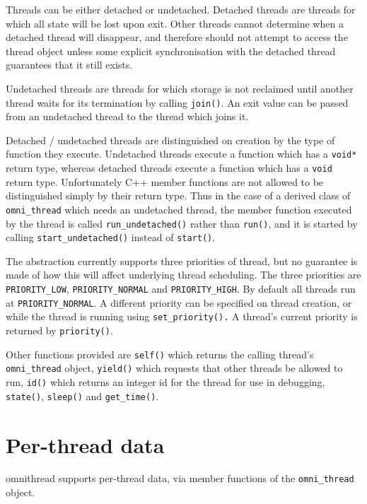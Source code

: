 \documentclass[11pt,twoside,a4paper]{article}
\newcommand{\dsc}{\discretionary{}{}}
\begin{document}
Threads can be either detached or undetached.  Detached threads are
threads for which all state will be lost upon exit.  Other threads
cannot determine when a detached thread will disappear, and therefore
should not attempt to access the thread object unless some explicit
synchronisation with the detached thread guarantees that it still
exists.

Undetached threads are threads for which storage is not reclaimed
until another thread waits for its termination by calling
\texttt{join()}.  An exit value can be passed from an undetached
thread to the thread which joins it.

Detached / undetached threads are distinguished on creation by the
type of function they execute.  Undetached threads execute a function
which has a \texttt{void*} return type, whereas detached threads
execute a function which has a \texttt{void} return type.
Unfortunately C++ member functions are not allowed to be distinguished
simply by their return type.  Thus in the case of a derived class of
\texttt{omni\_thread} which needs an undetached thread, the member
function executed by the thread is called \texttt{run\_undetached()}
rather than \texttt{run()}, and it is started by calling
\texttt{start\_\dsc{}undetached()} instead of \texttt{start()}.

The abstraction currently supports three priorities of thread, but no
guarantee is made of how this will affect underlying thread
scheduling.  The three priorities are \texttt{PRIORITY\_LOW},
\texttt{PRIORITY\_NORMAL} and \texttt{PRIORITY\_HIGH}.  By default all
threads run at \texttt{PRIORITY\_NORMAL}.  A different priority can be
specified on thread creation, or while the thread is running using
\texttt{set\_priority().}  A thread's current priority is returned by
\texttt{priority()}.

Other functions provided are \texttt{self()} which returns the calling
thread's \texttt{omni\_\dsc{}thread} object, \texttt{yield()} which
requests that other threads be allowed to run, \texttt{id()} which
returns an integer id for the thread for use in debugging,
\texttt{state()}, \texttt{sleep()} and \texttt{get\_time()}.



\section{Per-thread data}

omnithread supports per-thread data, via member functions of the
\texttt{omni\_thread} object.
\end{document}
